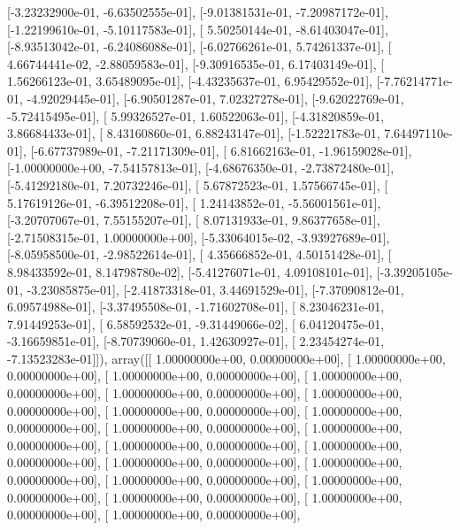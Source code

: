 \documentclass{article}
\begin{document}
       [-3.23232900e-01, -6.63502555e-01],
       [-9.01381531e-01, -7.20987172e-01],
       [-1.22199610e-01, -5.10117583e-01],
       [ 5.50250144e-01, -8.61403047e-01],
       [-8.93513042e-01, -6.24086088e-01],
       [-6.02766261e-01,  5.74261337e-01],
       [ 4.66744441e-02, -2.88059583e-01],
       [-9.30916535e-01,  6.17403149e-01],
       [ 1.56266123e-01,  3.65489095e-01],
       [-4.43235637e-01,  6.95429552e-01],
       [-7.76214771e-01, -4.92029445e-01],
       [-6.90501287e-01,  7.02327278e-01],
       [-9.62022769e-01, -5.72415495e-01],
       [ 5.99326527e-01,  1.60522063e-01],
       [-4.31820859e-01,  3.86684433e-01],
       [ 8.43160860e-01,  6.88243147e-01],
       [-1.52221783e-01,  7.64497110e-01],
       [-6.67737989e-01, -7.21171309e-01],
       [ 6.81662163e-01, -1.96159028e-01],
       [-1.00000000e+00, -7.54157813e-01],
       [-4.68676350e-01, -2.73872480e-01],
       [-5.41292180e-01,  7.20732246e-01],
       [ 5.67872523e-01,  1.57566745e-01],
       [ 5.17619126e-01, -6.39512208e-01],
       [ 1.24143852e-01, -5.56001561e-01],
       [-3.20707067e-01,  7.55155207e-01],
       [ 8.07131933e-01,  9.86377658e-01],
       [-2.71508315e-01,  1.00000000e+00],
       [-5.33064015e-02, -3.93927689e-01],
       [-8.05958500e-01, -2.98522614e-01],
       [ 4.35666852e-01,  4.50151428e-01],
       [ 8.98433592e-01,  8.14798780e-02],
       [-5.41276071e-01,  4.09108101e-01],
       [-3.39205105e-01, -3.23085875e-01],
       [-2.41873318e-01,  3.44691529e-01],
       [-7.37090812e-01,  6.09574988e-01],
       [-3.37495508e-01, -1.71602708e-01],
       [ 8.23046231e-01,  7.91449253e-01],
       [ 6.58592532e-01, -9.31449066e-02],
       [ 6.04120475e-01, -3.16659851e-01],
       [-8.70739060e-01,  1.42630927e-01],
       [ 2.23454274e-01, -7.13523283e-01]]), array([[ 1.00000000e+00,  0.00000000e+00],
       [ 1.00000000e+00,  0.00000000e+00],
       [ 1.00000000e+00,  0.00000000e+00],
       [ 1.00000000e+00,  0.00000000e+00],
       [ 1.00000000e+00,  0.00000000e+00],
       [ 1.00000000e+00,  0.00000000e+00],
       [ 1.00000000e+00,  0.00000000e+00],
       [ 1.00000000e+00,  0.00000000e+00],
       [ 1.00000000e+00,  0.00000000e+00],
       [ 1.00000000e+00,  0.00000000e+00],
       [ 1.00000000e+00,  0.00000000e+00],
       [ 1.00000000e+00,  0.00000000e+00],
       [ 1.00000000e+00,  0.00000000e+00],
       [ 1.00000000e+00,  0.00000000e+00],
       [ 1.00000000e+00,  0.00000000e+00],
       [ 1.00000000e+00,  0.00000000e+00],
       [ 1.00000000e+00,  0.00000000e+00],
       [ 1.00000000e+00,  0.00000000e+00],
       [ 1.00000000e+00,  0.00000000e+00],
\end{document}
